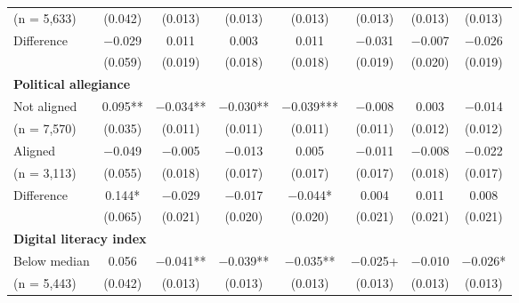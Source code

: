 \begin{table}[H]
{\begin{tabular}{lccccccc}
\hspace{1.5em}  (n = 5,633)	& (\num{0.042}) & (\num{0.013}) & (\num{0.013}) & (\num{0.013}) & (\num{0.013}) & (\num{0.013}) & (\num{0.013})\\
 \cmidrule(lr){2-8}
 \hspace{1em} Difference 			& \num{-0.029} & \num{0.011} & \num{0.003} & \num{0.011} & \num{-0.031} & \num{-0.007} & \num{-0.026}\\
 \hspace{1.5em} 				& (\num{0.059}) & (\num{0.019}) & (\num{0.018}) & (\num{0.018}) & (\num{0.019}) & (\num{0.020}) & (\num{0.019})\\  
 \multicolumn{4}{l}{\textbf{Political allegiance}} \rule{0pt}{1.2\normalbaselineskip}\\
\hspace{1em} Not aligned  		& \num{0.095}** & \num{-0.034}** & \num{-0.030}** & \num{-0.039}*** & \num{-0.008} & \num{0.003} & \num{-0.014}\\
\hspace{1.5em} (n = 7,570) 		& (\num{0.035}) & (\num{0.011}) & (\num{0.011}) & (\num{0.011}) & (\num{0.011}) & (\num{0.012}) & (\num{0.012})\\
\hspace{1em} Aligned  			& \num{-0.049} & \num{-0.005} & \num{-0.013} & \num{0.005} & \num{-0.011} & \num{-0.008} & \num{-0.022}\\
\hspace{1.5em} (n = 3,113)		& (\num{0.055}) & (\num{0.018}) & (\num{0.017}) & (\num{0.017}) & (\num{0.017}) & (\num{0.018}) & (\num{0.017})\\
  \cmidrule(lr){2-8}
 \hspace{1em} Difference 			& \num{0.144}* & \num{-0.029} & \num{-0.017} & \num{-0.044}* & \num{0.004} & \num{0.011} & \num{0.008}\\
\hspace{1.5em} 				& (\num{0.065}) & (\num{0.021}) & (\num{0.020}) & (\num{0.020}) & (\num{0.021}) & (\num{0.021}) & (\num{0.021})\\
 \multicolumn{4}{l}{\textbf{Digital literacy index }}  \rule{0pt}{1.2\normalbaselineskip}\\
\hspace{1em} Below median 		& \num{0.056} & \num{-0.041}** & \num{-0.039}** & \num{-0.035}** & \num{-0.025}+ & \num{-0.010} & \num{-0.026}*\\
\hspace{1.5em}  (n = 5,443)		& (\num{0.042}) & (\num{0.013}) & (\num{0.013}) & (\num{0.013}) & (\num{0.013}) & (\num{0.013}) & (\num{0.013})\\

\end{tabular}}
\end{table}
